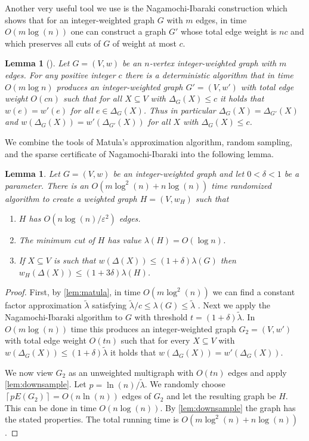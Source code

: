 \documentclass[10pt,a4paper]{article}
\newcommand{\ceil}[1]{\left\lceil #1 \right\rceil}
\newcommand{\1}{\mathbf{1}}
\newtheorem{lemma}[theorem]{Lemma}
\theoremstyle{definition}
\begin{document}
Another very useful tool we use is the Nagamochi-Ibaraki construction which shows that for an integer-weighted graph $G$ with $m$ edges, in time $O(m \log(n))$ one can construct 
a graph $G'$ whose total edge weight is $nc$ and which preserves all cuts of $G$ of weight at most $c$.  

\begin{lemma}[\cite{NI92}]
Let $G =(V,w)$ be an $n$-vertex integer-weighted graph with $m$ edges.  For any positive integer $c$ there is a deterministic algorithm that in time $O(m \log n)$ produces an integer-weighted graph $G' = (V,w')$ with 
total edge weight $O(cn)$ such that for all $X \subseteq V$ with $\Delta_G(X) \le c$ it holds that $w(e) = w'(e)$ for all $e \in \Delta_G(X)$.  Thus in particular $\Delta_G(X) = \Delta_{G'}(X)$ and $w(\Delta_G(X)) = w'(\Delta_{G'}(X))$ for 
all $X$ with $\Delta_G(X) \le c$.
\end{lemma}

We combine the tools of Matula's approximation algorithm, random sampling, and the sparse certificate of Nagamochi-Ibaraki into the following lemma.
\begin{lemma}
\label{lem:Hprop}
Let $G = (V,w)$ be an integer-weighted graph and let $0 < \delta < 1$ be a parameter.  There is an $O(m \log^2(n) + n\log(n))$ time randomized algorithm to create a weighted graph $H = (V, w_H)$ such that 
\begin{enumerate}
  \item $H$ has $O(n \log(n)/\varepsilon^2)$ edges.
  \item The minimum cut of $H$ has value $\lambda(H) = O(\log n)$.
  \item If $X \subseteq V$ is such that $w(\Delta(X)) \le (1+\delta) \lambda(G)$ then $w_H(\Delta(X)) \le (1+3\delta) \lambda(H)$.
\end{enumerate}
\end{lemma}

\begin{proof}
First, by \cref{lem:matula}, in time $O(m \log^2(n))$ we can find a constant factor approximation $\tilde \lambda$ satisfying $\tilde \lambda/c \le \lambda(G) \le \tilde \lambda$ .  Next we apply the Nagamochi-Ibaraki 
algorithm to $G$ with threshold $t = (1+\delta)\tilde \lambda$.  In $O(m \log(n))$ time this produces an integer-weighted graph $G_2 = (V,w')$ with total edge weight $O(tn)$ such that for every $X \subseteq V$ with 
$w(\Delta_G(X)) \le (1+\delta) \tilde \lambda$ it holds that $w(\Delta_G(X)) = w'(\Delta_G(X))$.  

We now view $G_2$ as an unweighted multigraph with $O(tn)$ edges and apply \cref{lem:downsample}.
Let $p = \ln(n)/\tilde \lambda$.  We randomly choose $\ceil{p E(G_2)} =  O(n \ln(n))$ edges of $G_2$ and let the resulting graph be $H$.  This can be done in time $O(n \log(n))$.  
By \cref{lem:downsample} the graph has the stated properties.  The total running time is $O(m\log^2(n)+ n \log(n))$.
\end{proof}
\end{document}
